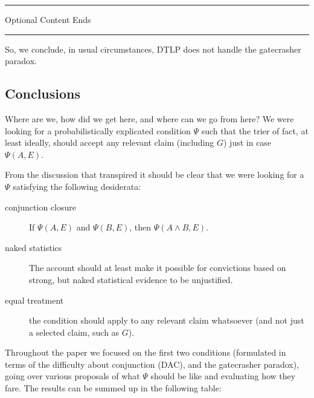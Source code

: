 \documentclass[
  10pt,
  dvipsnames,enabledeprecatedfontcommands]{scrartcl}
\newcommand{\et}{\wedge}
\newcommand{\intermezzob}{\nopagebreak 
	\begin{minipage}[c]{13cm}
	\begin{center}\rule{10cm}{0.4pt}

	\tiny{\sc Optional Content Ends}
	
	\vspace{-1mm}
	
	\rule{10cm}{0.4pt}\end{center}
	\end{minipage}
	}
\begin{document}
\intermezzob

So, we conclude, in usual circumstances, DTLP does not handle the
gatecrasher paradox.

\hypertarget{conclusions}{%
\subsection{Conclusions}\label{conclusions}}

Where are we, how did we get here, and where can we go from here? We
were looking for a probabilistically explicated condition \(\Psi\) such
that the trier of fact, at least ideally, should accept any relevant
claim (including \(G\)) just in case \(\Psi(A,E)\).

From the discussion that transpired it should be clear that we were
looking for a \(\Psi\) satisfying the following desiderata:

\begin{description}
\item[conjunction closure] If $\Psi(A,E)$ and $\Psi(B,E)$, then $\Psi(A\et B,E)$.
\item[naked statistics] The account should at least make it possible for convictions based on strong, but naked statistical evidence to be unjustified. 
\item[equal treatment] the condition should apply to any relevant claim whatsoever (and not just a selected claim, such as $G$).
\end{description}

Throughout the paper we focused on the first two conditions (formulated
in terms of the difficulty about conjunction (DAC), and the gatecrasher
paradox), going over various proposals of what \(\Psi\) should be like
and evaluating how they fare. The results can be summed up in the
following table:
\end{document}
